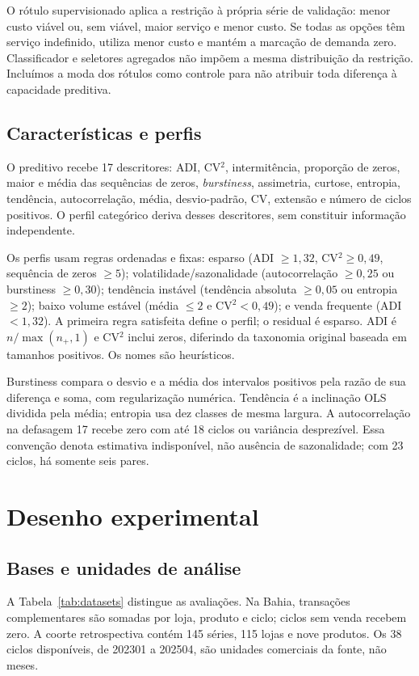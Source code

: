 \documentclass[preprint,12pt]{elsarticle}
\begin{document}
O rótulo supervisionado aplica a restrição à própria série de validação: menor custo viável ou, sem viável, maior serviço e menor custo. Se todas as opções têm serviço indefinido, utiliza menor custo e mantém a marcação de demanda zero. Classificador e seletores agregados não impõem a mesma distribuição da restrição. Incluímos a moda dos rótulos como controle para não atribuir toda diferença à capacidade preditiva.

\subsection{Características e perfis}
O preditivo recebe 17 descritores: ADI, CV$^2$, intermitência, proporção de zeros, maior e média das sequências de zeros, \textit{burstiness}, assimetria, curtose, entropia, tendência, autocorrelação, média, desvio-padrão, CV, extensão e número de ciclos positivos. O perfil categórico deriva desses descritores, sem constituir informação independente.

Os perfis usam regras ordenadas e fixas: esparso (ADI $\geq1{,}32$, CV$^2\geq0{,}49$, sequência de zeros $\geq5$); volatilidade/sazonalidade (autocorrelação $\geq0{,}25$ ou burstiness $\geq0{,}30$); tendência instável (tendência absoluta $\geq0{,}05$ ou entropia $\geq2$); baixo volume estável (média $\leq2$ e CV$^2<0{,}49$); e venda frequente (ADI $<1{,}32$). A primeira regra satisfeita define o perfil; o residual é esparso. ADI é $n/\max(n_+,1)$ e CV$^2$ inclui zeros, diferindo da taxonomia original baseada em tamanhos positivos. Os nomes são heurísticos.

Burstiness compara o desvio e a média dos intervalos positivos pela razão de sua diferença e soma, com regularização numérica. Tendência é a inclinação OLS dividida pela média; entropia usa dez classes de mesma largura. A autocorrelação na defasagem 17 recebe zero com até 18 ciclos ou variância desprezível. Essa convenção denota estimativa indisponível, não ausência de sazonalidade; com 23 ciclos, há somente seis pares.

\section{Desenho experimental}
\subsection{Bases e unidades de análise}
A Tabela~\ref{tab:datasets} distingue as avaliações. Na Bahia, transações complementares são somadas por loja, produto e ciclo; ciclos sem venda recebem zero. A coorte retrospectiva contém 145 séries, 115 lojas e nove produtos. Os 38 ciclos disponíveis, de 202301 a 202504, são unidades comerciais da fonte, não meses.
\end{document}
